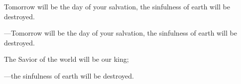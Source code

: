 \responsory

\begin{hangpar}


\medskip Tomorrow will be the day of your salvation,
the sinfulness of earth will be destroyed.

{\color{red}---\thinspace }Tomorrow will be the day of your salvation,
the sinfulness of earth will be destroyed.

\medskip The Savior of the world will be our king;

{\color{red}---\thinspace }the sinfulness of earth will be destroyed.
\end{hangpar}